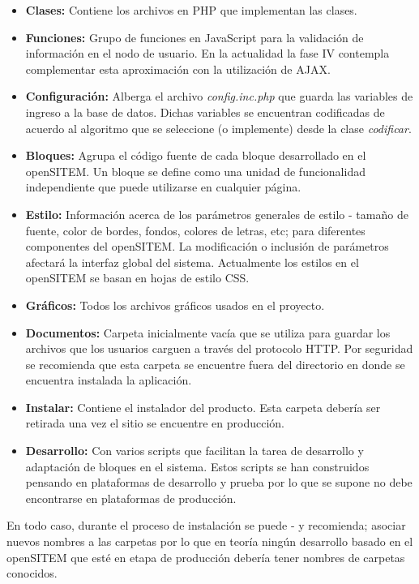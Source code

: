\begin{itemize}
 \item \textbf{Clases:} Contiene los archivos en PHP que implementan las clases. 
\item \textbf{Funciones:} Grupo de funciones en JavaScript para la validación de información en el nodo de usuario. En la actualidad la fase IV contempla complementar esta aproximación con la utilización de AJAX.
\item \textbf{Configuración:} Alberga el archivo \textit{config.inc.php} que guarda las variables de ingreso a la base de datos. Dichas variables se encuentran codificadas de acuerdo al algoritmo que se seleccione (o implemente) desde la clase \textit{codificar}.
\item \textbf{Bloques:} Agrupa el código fuente de cada bloque desarrollado en el openSITEM. Un bloque se define como una unidad de funcionalidad independiente que puede utilizarse en cualquier página.
\item \textbf{Estilo:} Información acerca de los parámetros generales de estilo - tamaño de fuente, color de bordes, fondos, colores de letras, etc; para diferentes componentes del openSITEM. La modificación o inclusión de parámetros afectará la interfaz global del sistema. Actualmente los estilos en el openSITEM se basan en hojas de estilo CSS.
\item \textbf{Gráficos:} Todos los archivos gráficos usados en el proyecto.
\item \textbf{Documentos:} Carpeta inicialmente vacía que se utiliza para guardar los archivos que los usuarios carguen a través del protocolo HTTP. Por seguridad se recomienda que esta carpeta se encuentre fuera del directorio en donde se encuentra instalada la aplicación.
\item \textbf{Instalar:} Contiene el instalador del producto. Esta carpeta debería ser retirada una vez el sitio se encuentre en producción.
\item \textbf{Desarrollo:} Con varios scripts que facilitan la tarea de desarrollo y adaptación de bloques en el sistema. Estos scripts se han construidos pensando en plataformas de desarrollo y prueba por lo que se supone no debe encontrarse en plataformas de producción.
\end{itemize}

En todo caso, durante el proceso de instalación se puede - y recomienda; asociar nuevos nombres a las carpetas por lo que en teoría ningún desarrollo basado en el openSITEM que esté en etapa de producción debería tener nombres de carpetas conocidos.

